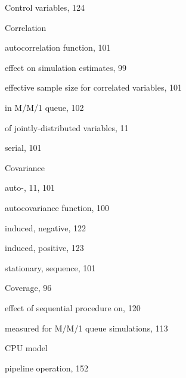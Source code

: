 \noindent Control variables, 124\par
\noindent Correlation\par
\quad autocorrelation function, 101\par
\quad effect on simulation estimates, 99\par
\quad effective sample size for correlated variables, 101\par
\quad in M/M/1 queue, 102\par
\quad of jointly-distributed variables, 11\par
\quad serial, 101\par
\noindent Covariance\par
\quad auto-, 11, 101\par
\quad autocovariance function, 100\par
\quad induced, negative, 122\par
\quad induced, positive, 123\par
\quad stationary, sequence, 101\par
\noindent Coverage, 96\par
\quad effect of sequential procedure on, 120\par
\quad measured for M/M/1 queue simulations, 113\par
\noindent CPU model\par
\quad pipeline operation, 152\par
